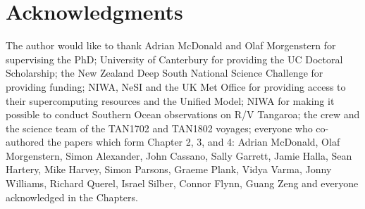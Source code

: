 \chapter*{Acknowledgments}

The author would like to thank Adrian McDonald and Olaf Morgenstern for
supervising the PhD; University of Canterbury for providing the UC Doctoral
Scholarship; the New Zealand Deep South National Science Challenge for providing
funding; NIWA, NeSI and the UK Met Office for providing access to their
supercomputing resources and the Unified Model; NIWA for making it possible to
conduct Southern Ocean observations on R/V Tangaroa; the crew and the science
team of the TAN1702 and TAN1802 voyages; everyone who co-authored the papers
which form Chapter 2, 3, and 4: Adrian McDonald, Olaf Morgenstern, Simon
Alexander, John Cassano, Sally Garrett, Jamie Halla, Sean Hartery, Mike Harvey,
Simon Parsons, Graeme Plank, Vidya Varma, Jonny Williams, Richard Querel, Israel
Silber, Connor Flynn, Guang Zeng and everyone acknowledged in the Chapters.
